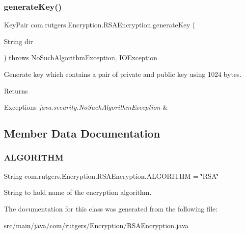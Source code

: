 \subsubsection{\texorpdfstring{generate\+Key()}{generateKey()}}
{\footnotesize\ttfamily Key\+Pair com.\+rutgers.\+Encryption.\+R\+S\+A\+Encryption.\+generate\+Key (\begin{DoxyParamCaption}\item[{String}]{dir }\end{DoxyParamCaption}) throws No\+Such\+Algorithm\+Exception, I\+O\+Exception}

Generate key which contains a pair of private and public key using 1024 bytes.

\begin{DoxyReturn}{Returns}

\end{DoxyReturn}

\begin{DoxyExceptions}{Exceptions}
{\em java.\+security.\+No\+Such\+Algorithm\+Exception} & \\
\hline
\end{DoxyExceptions}


\subsection{Member Data Documentation}
\mbox{\label{classcom_1_1rutgers_1_1Encryption_1_1RSAEncryption_a4bb698f85fd1a2ed91a697473c71c405}} 
\subsubsection{\texorpdfstring{A\+L\+G\+O\+R\+I\+T\+HM}{ALGORITHM}}
{\footnotesize\ttfamily String com.\+rutgers.\+Encryption.\+R\+S\+A\+Encryption.\+A\+L\+G\+O\+R\+I\+T\+HM = \char`\"{}R\+SA\char`\"{}}

String to hold name of the encryption algorithm. 

The documentation for this class was generated from the following file\+:\begin{DoxyCompactItemize}
\item 
src/main/java/com/rutgers/\+Encryption/R\+S\+A\+Encryption.\+java\end{DoxyCompactItemize}
